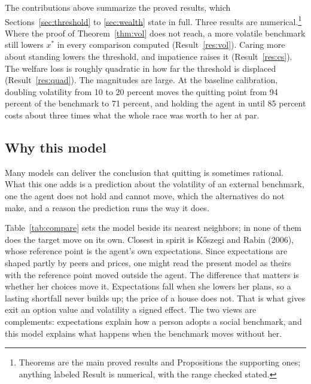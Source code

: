 \documentclass[12pt]{article}
\theoremstyle{definition}
\theoremstyle{remark}
\theoremstyle{plain}
\theoremstyle{definition}
\begin{document}
\noindent The contributions above summarize the proved results, which Sections~\ref{sec:threshold} to \ref{sec:wealth} state in full. Three results are numerical.\footnote{Theorems are the main proved results and Propositions the supporting ones; anything labeled Result is numerical, with the range checked stated.} Where the proof of Theorem~\ref{thm:vol} does not reach, a more volatile benchmark still lowers $x^*$ in every comparison computed (Result~\ref{res:vol}). Caring more about standing lowers the threshold, and impatience raises it (Result~\ref{res:cs}). The welfare loss is roughly quadratic in how far the threshold is displaced (Result~\ref{res:quad}). The magnitudes are large. At the baseline calibration, doubling volatility from 10 to 20 percent moves the quitting point from 94 percent of the benchmark to 71 percent, and holding the agent in until 85 percent costs about three times what the whole race was worth to her at par.

\subsection{Why this model}\label{sec:why}

Many models can deliver the conclusion that quitting is sometimes rational. What this one adds is a prediction about the volatility of an external benchmark, one the agent does not hold and cannot move, which the alternatives do not make, and a reason the prediction runs the way it does.

Table~\ref{tab:compare} sets the model beside its nearest neighbors; in none of them does the target move on its own. Closest in spirit is K\H{o}szegi and Rabin (2006), whose reference point is the agent's own expectations. Since expectations are shaped partly by peers and prices, one might read the present model as theirs with the reference point moved outside the agent. The difference that matters is whether her choices move it. Expectations fall when she lowers her plans, so a lasting shortfall never builds up; the price of a house does not. That is what gives exit an option value and volatility a signed effect. The two views are complements: expectations explain how a person adopts a social benchmark, and this model explains what happens when the benchmark moves without her.
\end{document}
